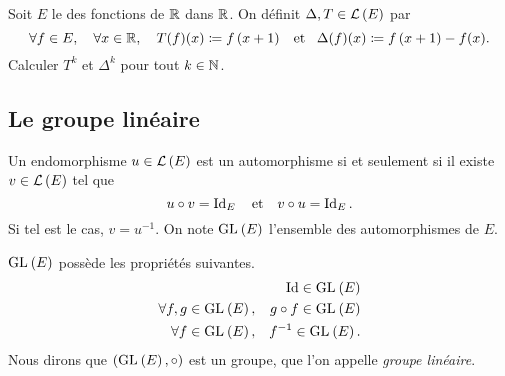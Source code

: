 \documentclass{magnoliaold}
\begin{document}



\begin{exoUnique}
\exo Soit $E$ le \Rev des fonctions de $\mathbb{R}$ dans $\mathbb{R}$. On définit
  $\Delta,T\in\mathcal{L}\left(E\right)$ par
  \[\forall f\in E ,\quad \forall x\in\mathbb{R} ,\quad T(f)(x)\coloneqq f\left(x+1\right) \quad\!\text{et}\quad\!
    \Delta(f)(x)\coloneqq f\left(x+1\right)-f(x).\]
  Calculer $T^k$ et $\Delta^k$ pour tout $k\in\mathbb{N}$.
\end{exoUnique}

\subsection{Le groupe linéaire}

\begin{definition}
Un endomorphisme $u\in\mathcal{L}\left(E\right)$ est un automorphisme si et seulement si il existe $v\in\mathcal{L}\left(E\right)$ tel que
\[u\circ v = \operatorname{Id}_E \quad\text{et}\quad v\circ u=\operatorname{Id}_E.\]
Si tel est le cas, $v=u^{-1}$. On note ${\rm GL}_{}\left(E\right)$ l'ensemble des automorphismes de $E$.
\end{definition}

\begin{proposition}
  ${\rm GL}_{}\left(E\right)$ possède les propriétés suivantes.
\begin{eqnarray*}
& & \operatorname{Id}\in{\rm GL}_{}\left(E\right)\\
\forall f,g\in{\rm GL}_{}\left(E\right),& & g\circ f\in{\rm GL}_{}\left(E\right)\\
\forall f\in{\rm GL}_{}\left(E\right),& & f^{-1}\in{\rm GL}_{}\left(E\right).
\end{eqnarray*}
Nous dirons que $({\rm GL}_{}\left(E\right),\circ)$ est un groupe, que l'on appelle \emph{groupe linéaire}.
\end{proposition}
\end{document}

